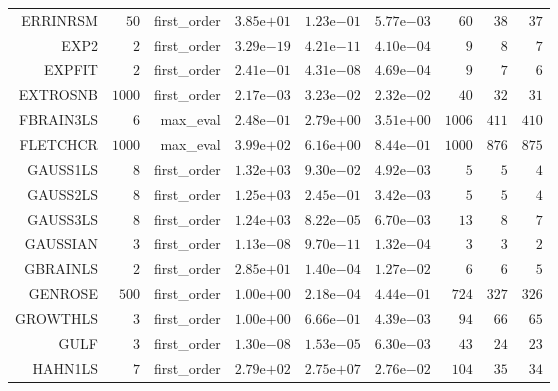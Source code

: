 \begin{longtable}{rrrrrrrrr}
ERRINRSM & \(    50\) & first\_order & \( 3.85\)e\(+01\) & \( 1.23\)e\(-01\) & \( 5.77\)e\(-03\) & \(    60\) & \(    38\) & \(    37\) \\
EXP2 & \(     2\) & first\_order & \( 3.29\)e\(-19\) & \( 4.21\)e\(-11\) & \( 4.10\)e\(-04\) & \(     9\) & \(     8\) & \(     7\) \\
EXPFIT & \(     2\) & first\_order & \( 2.41\)e\(-01\) & \( 4.31\)e\(-08\) & \( 4.69\)e\(-04\) & \(     9\) & \(     7\) & \(     6\) \\
EXTROSNB & \(  1000\) & first\_order & \( 2.17\)e\(-03\) & \( 3.23\)e\(-02\) & \( 2.32\)e\(-02\) & \(    40\) & \(    32\) & \(    31\) \\
FBRAIN3LS & \(     6\) & max\_eval & \( 2.48\)e\(-01\) & \( 2.79\)e\(+00\) & \( 3.51\)e\(+00\) & \(  1006\) & \(   411\) & \(   410\) \\
FLETCHCR & \(  1000\) & max\_eval & \( 3.99\)e\(+02\) & \( 6.16\)e\(+00\) & \( 8.44\)e\(-01\) & \(  1000\) & \(   876\) & \(   875\) \\
GAUSS1LS & \(     8\) & first\_order & \( 1.32\)e\(+03\) & \( 9.30\)e\(-02\) & \( 4.92\)e\(-03\) & \(     5\) & \(     5\) & \(     4\) \\
GAUSS2LS & \(     8\) & first\_order & \( 1.25\)e\(+03\) & \( 2.45\)e\(-01\) & \( 3.42\)e\(-03\) & \(     5\) & \(     5\) & \(     4\) \\
GAUSS3LS & \(     8\) & first\_order & \( 1.24\)e\(+03\) & \( 8.22\)e\(-05\) & \( 6.70\)e\(-03\) & \(    13\) & \(     8\) & \(     7\) \\
GAUSSIAN & \(     3\) & first\_order & \( 1.13\)e\(-08\) & \( 9.70\)e\(-11\) & \( 1.32\)e\(-04\) & \(     3\) & \(     3\) & \(     2\) \\
GBRAINLS & \(     2\) & first\_order & \( 2.85\)e\(+01\) & \( 1.40\)e\(-04\) & \( 1.27\)e\(-02\) & \(     6\) & \(     6\) & \(     5\) \\
GENROSE & \(   500\) & first\_order & \( 1.00\)e\(+00\) & \( 2.18\)e\(-04\) & \( 4.44\)e\(-01\) & \(   724\) & \(   327\) & \(   326\) \\
GROWTHLS & \(     3\) & first\_order & \( 1.00\)e\(+00\) & \( 6.66\)e\(-01\) & \( 4.39\)e\(-03\) & \(    94\) & \(    66\) & \(    65\) \\
GULF & \(     3\) & first\_order & \( 1.30\)e\(-08\) & \( 1.53\)e\(-05\) & \( 6.30\)e\(-03\) & \(    43\) & \(    24\) & \(    23\) \\
HAHN1LS & \(     7\) & first\_order & \( 2.79\)e\(+02\) & \( 2.75\)e\(+07\) & \( 2.76\)e\(-02\) & \(   104\) & \(    35\) & \(    34\) \\

\end{longtable}
